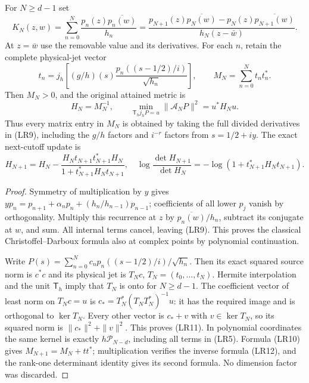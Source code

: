 \begin{proposition}
For $N\ge d-1$ set
\[
 K_N(z,w)=\sum_{n=0}^N\frac{p_n(z)\overline{p_n(w)}}{h_n}
 =\frac{p_{N+1}(z)\overline{p_N(w)}-
 p_N(z)\overline{p_{N+1}(w)}}{h_N(z-\bar w)}.\tag{LR9}
\]
At $z=\bar w$ use the removable value and its derivatives.
For each $n$, retain the complete physical-jet vector
\[
 t_n=j_h\left[(g/h)(s)\frac{p_n((s-1/2)/i)}{\sqrt{h_n}}\right],
 \qquad M_N=\sum_{n=0}^N t_nt_n^*.\tag{LR10}
\]
Then $M_N>0$, and the original attained metric is
\[
 H_N=M_N^{-1},\qquad
 \min_{\mathsf T_hj_hP=u}\|\mathcal A_NP\|^2=u^*H_Nu.
 \tag{LR11}
\]
Thus every matrix entry in $M_N$ is obtained by taking the full divided
derivatives in (LR9), including the $g/h$ factors and $i^{-r}$ factors
from $s=1/2+iy$. The exact next-cutoff update is
\[
 H_{N+1}=H_N-\frac{H_Nt_{N+1}t_{N+1}^*H_N}
 {1+t_{N+1}^*H_Nt_{N+1}},\quad
 \log\frac{\det H_{N+1}}{\det H_N}
 =-\log(1+t_{N+1}^*H_Nt_{N+1}).\tag{LR12}
\]
\end{proposition}
\begin{proof}
Symmetry of multiplication by $y$ gives
$yp_n=p_{n+1}+\alpha_np_n+(h_n/h_{n-1})p_{n-1}$; coefficients
of all lower $p_j$ vanish by orthogonality. Multiply this recurrence
at $z$ by $\overline{p_n(w)}/h_n$, subtract its conjugate at $w$,
and sum. All internal terms cancel, leaving (LR9). This proves the
classical Christoffel--Darboux formula \cite[18.2.12]{DLMF18}
also at complex points by polynomial continuation.

Write $P(s)=\sum_{n=0}^N c_np_n((s-1/2)/i)/\sqrt{h_n}$.
Then its exact squared source norm is $c^*c$ and its physical jet is
$T_Nc$, $T_N=(t_0,\ldots,t_N)$. Hermite interpolation and the unit
$\mathsf T_h$ imply that $T_N$ is onto for $N\ge d-1$.
The coefficient vector of least norm on $T_Nc=u$ is
$c_*=T_N^*(T_NT_N^*)^{-1}u$: it has the required image and is
orthogonal to $\ker T_N$. Every other vector is $c_*+v$ with
$v\in\ker T_N$, so its squared norm is $\|c_*\|^2+\|v\|^2$.
This proves (LR11). In polynomial coordinates the same kernel is
exactly $h\mathcal P_{N-d}$, including all terms in (LR5).
Formula (LR10) gives $M_{N+1}=M_N+tt^*$; multiplication verifies
the inverse formula (LR12), and the rank-one determinant identity
gives its second formula. No dimension factor was discarded.
\end{proof}

